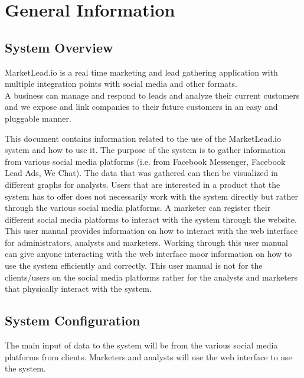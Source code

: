 \documentclass{article}
\begin{document}
	\cleardoublepage
	\tableofcontents
	\cleardoublepage
	
	\section{General Information}
		\subsection{System Overview}
			MarketLead.io is a real time marketing and lead gathering application with multiple integration points with social media and other formats.\\
			A business can manage and respond to leads and analyze their current customers and we expose and link companies to their future customers in an easy and pluggable manner.

			This document contains information related to the use of the MarketLead.io system and how to use it.
			The purpose of the system is to gather information from various social media platforms (i.e. from Facebook Messenger, Facebook Lead Ads, We Chat). The data that was gathered can then be visualized in different graphs for analysts. 
			Users that are interested in a product that the system has to offer does not necessarily work with the system directly but rather through the various social media platforms.
			A marketer can register their different social media platforms to interact with the system through the website.
			This user manual provides information on how to interact with the web interface for administrators, analysts and marketers. 
			Working through this user manual can give anyone interacting with the web interface moor information on how to use the system efficiently and correctly.
			This user manual is not for the clients/users on the social media platforms rather for the analysts and marketers that physically interact with the system.

		\subsection{System Configuration} %
			The main input of data to the system will be from the various social media platforms from clients. Marketers and analysts will use the web interface to use the system.
			
\end{document}
